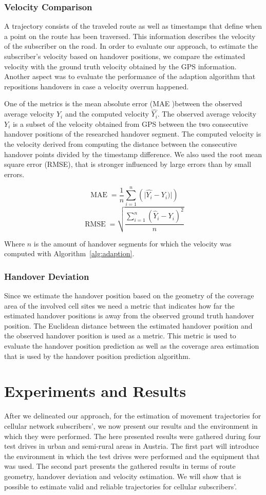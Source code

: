 \documentclass[twocolumn]{bmcart}%
\begin{document}
\subsubsection*{Velocity Comparison}
A trajectory consists of the traveled route as well as timestamps that define when a point on the route has been traversed. This information describes the velocity of the subscriber on the road. In order to evaluate our approach, to estimate the subscriber's velocity based on handover positions, we compare the estimated velocity with the ground truth velocity obtained by the GPS information. Another aspect was to evaluate the performance of the adaption algorithm that repositions handovers in case a velocity overrun happened.

One of the metrics is the mean absolute error (MAE )between the observed average velocity $ Y_i$  and the computed velocity $ \hat{Y_i}$. The observed average velocity $Y_i$ is a subset of the velocity obtained from GPS between the two consecutive handover positions of the researched handover segment. The computed velocity is the velocity derived from computing the distance between the consecutive handover points divided by the timestamp difference. We also used the root mean square error (RMSE), that is stronger influenced by large errors than by small errors.

\[\operatorname{MAE}  = \frac{1}{n}\sum_{i=1}^{n} \left(\lvert \hat{Y_i} - Y_i) \rvert \right)\]
\[\operatorname{RMSE}=\sqrt{\frac{\sum_{i=1}^n (\hat Y_i - Y_i)^2}{n}}\]

Where $n$ is the amount of handover segments for which the velocity was computed with Algorithm~\ref{alg:adaption}.
\subsubsection*{Handover Deviation}
Since we estimate the handover position based on the geometry of the coverage area of the involved cell sites we need a metric that indicates how far the estimated handover positions is away from the observed ground truth handover position. The Euclidean distance between the estimated handover position and the observed handover position is used as a metric. This metric is used to evaluate the handover position prediction as well as the coverage area estimation that is used by the handover position prediction algorithm.

\section*{Experiments and Results}
\label{sec:results}
After we delineated our approach, for the estimation of movement trajectories for cellular network subscribers', we now present our results and the environment in which they were performed. The here presented results were gathered during four test drives in urban and semi-rural areas in Austria. The first part will introduce the environment in which the test drives were performed and the equipment that was used. The second part presents the gathered results in terms of route geometry, handover deviation and velocity estimation. We will show that is possible to estimate valid and reliable trajectories for cellular subscribers'.
\end{document}
